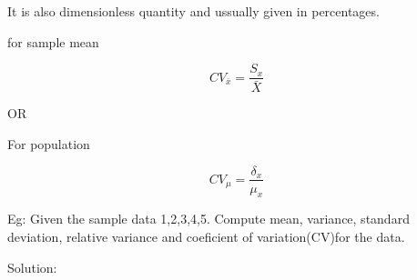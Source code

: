 \documentclass[12pt]{article}
\begin{document}
It is also dimensionless quantity and ussually given in percentages.

\begin{center}
    for sample mean
\end{center}
\begin{equation}
    CV_{\bar{x}} = \frac{S_x}{\bar{X}}
\end{equation}
\begin{center}
    OR
\end{center}
\begin{center}
    For population
\end{center}
\begin{equation}
    CV_{\mu} = \frac{\delta_x}{\mu_x}
\end{equation}


Eg: Given the sample data 1,2,3,4,5. Compute mean, variance, standard deviation, relative variance and coeficient of variation(CV)for the data.

Solution:
\end{document}
